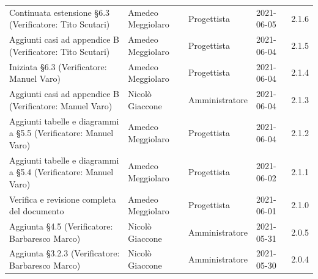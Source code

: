 \documentclass[a4paper]{article}
\begin{document}
\begin{center}
\begin{table}[h!]
\begin{tabular}{p{160px} p{90px} p{70px} p{55px} p{45px}}
            Continuata estensione \S 6.3 \newline(Verificatore: Tito Scutari)                                       & Amedeo Meggiolaro & Progettista    & 2021-06-05    & 2.1.6             \\
            Aggiunti casi ad appendice B \newline(Verificatore: Tito Scutari)                                       & Amedeo Meggiolaro & Progettista    & 2021-06-04    & 2.1.5             \\
            Iniziata \S 6.3 \newline(Verificatore: Manuel Varo)                                                     & Amedeo Meggiolaro & Progettista    & 2021-06-04    & 2.1.4             \\
            Aggiunti casi ad appendice B \newline(Verificatore: Manuel Varo)                                        & Nicolò Giaccone   & Amministratore   & 2021-06-04    & 2.1.3           \\
            Aggiunti tabelle e diagrammi a \S 5.5 \newline(Verificatore: Manuel Varo)                               & Amedeo Meggiolaro & Progettista    & 2021-06-04    & 2.1.2             \\
            Aggiunti tabelle e diagrammi a \S 5.4 \newline(Verificatore: Manuel Varo)                               & Amedeo Meggiolaro & Progettista    & 2021-06-02    & 2.1.1             \\
            Verifica e revisione completa del documento                                                             & Amedeo Meggiolaro & Progettista    & 2021-06-01    & 2.1.0             \\
            Aggiunta \S 4.5 \newline(Verificatore: Barbaresco Marco)                                                & Nicolò Giaccone   & Amministratore   & 2021-05-31    & 2.0.5           \\
            Aggiunta \S 3.2.3 \newline(Verificatore: Barbaresco Marco)                                              & Nicolò Giaccone   & Amministratore   & 2021-05-30    & 2.0.4           \\
            
            
        \end{tabular}
    \end{table}


\end{center}
\end{document}
